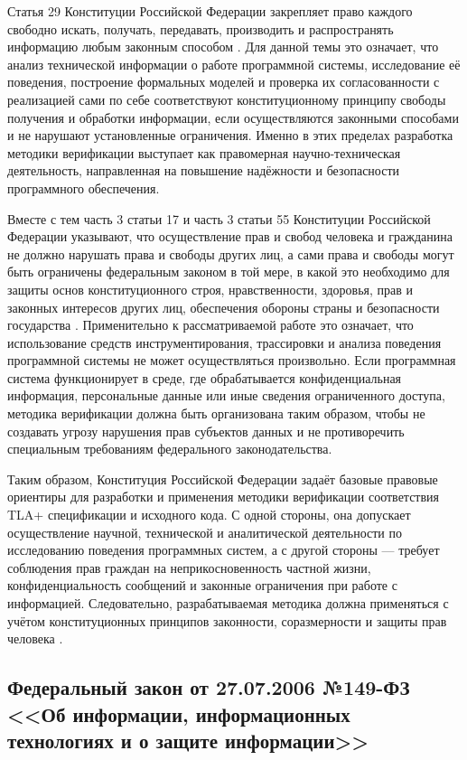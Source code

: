 Статья 29 Конституции Российской Федерации закрепляет право каждого
свободно искать, получать, передавать, производить и распространять
информацию любым законным способом \cite{constitution_rf}. Для данной темы
это означает, что анализ технической информации о работе программной
системы, исследование её поведения, построение формальных моделей и
проверка их согласованности с реализацией сами по себе соответствуют
конституционному принципу свободы получения и обработки информации, если
осуществляются законными способами и не нарушают установленные ограничения.
Именно в этих пределах разработка методики верификации выступает как
правомерная научно-техническая деятельность, направленная на повышение
надёжности и безопасности программного обеспечения.

Вместе с тем часть 3 статьи 17 и часть 3 статьи 55 Конституции Российской
Федерации указывают, что осуществление прав и свобод человека и гражданина
не должно нарушать права и свободы других лиц, а сами права и свободы
могут быть ограничены федеральным законом в той мере, в какой это
необходимо для защиты основ конституционного строя, нравственности,
здоровья, прав и законных интересов других лиц, обеспечения обороны страны
и безопасности государства \cite{constitution_rf}. Применительно к
рассматриваемой работе это означает, что использование средств
инструментирования, трассировки и анализа поведения программной системы не
может осуществляться произвольно. Если программная система функционирует в
среде, где обрабатывается конфиденциальная информация, персональные данные
или иные сведения ограниченного доступа, методика верификации должна быть
организована таким образом, чтобы не создавать угрозу нарушения прав
субъектов данных и не противоречить специальным требованиям федерального
законодательства.

Таким образом, Конституция Российской Федерации задаёт базовые правовые
ориентиры для разработки и применения методики верификации соответствия
TLA+ спецификации и исходного кода. С одной стороны, она допускает
осуществление научной, технической и аналитической деятельности по
исследованию поведения программных систем, а с другой стороны --- требует
соблюдения прав граждан на неприкосновенность частной жизни,
конфиденциальность сообщений и законные ограничения при работе с
информацией. Следовательно, разрабатываемая методика должна применяться с
учётом конституционных принципов законности, соразмерности и защиты прав
человека \cite{constitution_rf}.

\subsection{Федеральный закон от 27.07.2006 №149-ФЗ <<Об информации, информационных технологиях и о защите информации>>}

